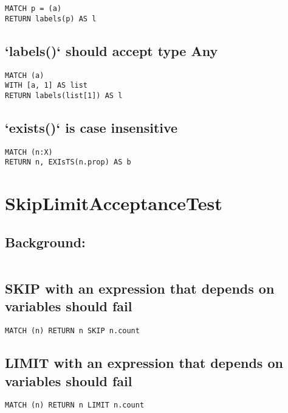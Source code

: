 \begin{lstlisting}
MATCH p = (a)
RETURN labels(p) AS l
\end{lstlisting}

\subsection{`labels()` should accept type Any}

\begin{lstlisting}
MATCH (a)
WITH [a, 1] AS list
RETURN labels(list[1]) AS l
\end{lstlisting}

\subsection{`exists()` is case insensitive}

\begin{lstlisting}
MATCH (n:X)
RETURN n, EXIsTS(n.prop) AS b
\end{lstlisting}
\section{SkipLimitAcceptanceTest}


\subsection{Background:}

\begin{lstlisting}
\end{lstlisting}

\subsection{SKIP with an expression that depends on variables should fail}

\begin{lstlisting}
MATCH (n) RETURN n SKIP n.count
\end{lstlisting}

\subsection{LIMIT with an expression that depends on variables should fail}

\begin{lstlisting}
MATCH (n) RETURN n LIMIT n.count
\end{lstlisting}

